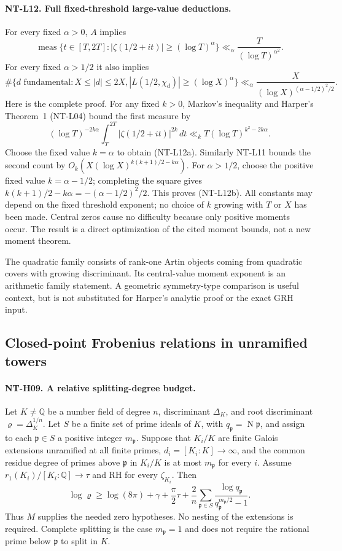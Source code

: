 \paragraph{NT-L12. Full fixed-threshold large-value deductions.}
For every fixed $\alpha>0$, $A$ implies
\[
 \operatorname{meas}\{t\in[T,2T]:
            |\zeta(1/2+it)|\ge(\log T)^\alpha\}
       \ll_\alpha \frac{T}{(\log T)^{\alpha^2}}.
\tag{NT-L12a}
\]
For every fixed $\alpha>1/2$ it also implies
\[
 \#\{d\text{ fundamental}:X\le|d|\le2X,
          |L(1/2,\chi_d)|\ge(\log X)^\alpha\}
       \ll_\alpha
          \frac{X}{(\log X)^{(\alpha-1/2)^2/2}}.
\tag{NT-L12b}
\]
Here is the complete proof.  For any fixed $k>0$, Markov's
inequality and Harper's Theorem~1 (NT-L04) bound the first measure by
\[
 (\log T)^{-2k\alpha}
       \int_T^{2T}|\zeta(1/2+it)|^{2k}\,dt
       \ll_k T(\log T)^{k^2-2k\alpha}.
\]
Choose the fixed value $k=\alpha$ to obtain (NT-L12a).
Similarly NT-L11 bounds the second count by
$O_k(X(\log X)^{k(k+1)/2-k\alpha})$.
For $\alpha>1/2$, choose the positive fixed value
$k=\alpha-1/2$; completing the square gives
$k(k+1)/2-k\alpha=-(\alpha-1/2)^2/2$.
This proves (NT-L12b).  All constants may depend on the fixed
threshold exponent; no choice of $k$ growing with $T$ or $X$ has
been made.  Central zeros cause no difficulty because only positive
moments occur.  The result is a direct optimization of the cited
moment bounds, not a new moment theorem.

The quadratic family consists of rank-one Artin objects coming from
quadratic covers with growing discriminant.  Its central-value
moment exponent is an arithmetic family statement.  A geometric
symmetry-type comparison is useful context, but is not substituted
for Harper's analytic proof or the exact GRH input.

\subsection{Closed-point Frobenius relations in unramified towers}

\paragraph{NT-H09. A relative splitting-degree budget.}
Let $K\ne\mathbb Q$ be a number field of degree $n$, discriminant
$\Delta_K$, and root discriminant $\varrho=\Delta_K^{1/n}$.
Let $S$ be a finite set of prime ideals of $K$, with
$q_{\mathfrak p}=\operatorname N\mathfrak p$, and assign to each
$\mathfrak p\in S$ a positive integer $m_{\mathfrak p}$.
Suppose that $K_i/K$ are finite Galois extensions unramified at all
finite primes, $d_i=[K_i:K]\to\infty$, and the common residue
degree of primes above $\mathfrak p$ in $K_i/K$ is at most
$m_{\mathfrak p}$ for every $i$.  Assume
$r_1(K_i)/[K_i:\mathbb Q]\to\tau$ and RH for every
$\zeta_{K_i}$.  Then
\[
 \log\varrho\ge\log(8\pi)+\gamma+\frac\pi2\tau
  +\frac2n\sum_{\mathfrak p\in S}
       \frac{\log q_{\mathfrak p}}
            {q_{\mathfrak p}^{m_{\mathfrak p}/2}-1}.
\tag{NT-H09}
\]
Thus $M$ supplies the needed zero hypotheses.  No nesting of the
extensions is required.  Complete splitting is the case
$m_{\mathfrak p}=1$ and does not require the rational prime below
$\mathfrak p$ to split in $K$.

